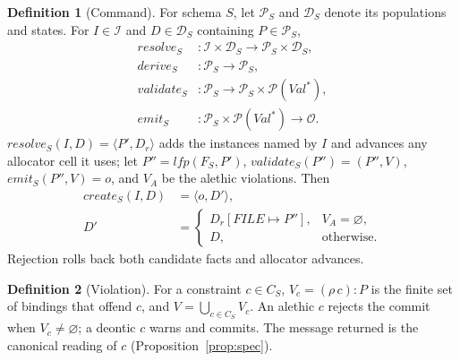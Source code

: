 \documentclass[10pt,twocolumn]{article}
\theoremstyle{plain}
\theoremstyle{definition}
\newtheorem{definition}{Definition}
\begin{document}
\begin{definition}[Command]\label{def:stages}
For schema $S$, let $\mathcal{P}_S$ and $\mathcal{D}_S$ denote its populations and states. For $I\in\mathcal{I}$ and $D\in\mathcal{D}_S$ containing $P\in\mathcal{P}_S$,
\[
\begin{aligned}
\mathit{resolve}_S &: \mathcal{I}\times\mathcal{D}_S \to \mathcal{P}_S\times\mathcal{D}_S,\\
\mathit{derive}_S &: \mathcal{P}_S\to\mathcal{P}_S,\\
\mathit{validate}_S &: \mathcal{P}_S\to\mathcal{P}_S\times\mathcal{P}(\mathit{Val}^{*}),\\
\mathit{emit}_S &: \mathcal{P}_S\times\mathcal{P}(\mathit{Val}^{*})\to\mathcal{O}.
\end{aligned}
\]
$\mathit{resolve}_S(I,D)=\langle P',D_r\rangle$ adds the instances named by $I$ and advances any allocator cell it uses; let $P''=\mathit{lfp}(F_S,P')$, $\mathit{validate}_S(P'')=(P'',V)$, $\mathit{emit}_S(P'',V)=o$, and $V_A$ be the alethic violations. Then
\begin{align}
\mathit{create}_S(I,D)&=\langle o,D'\rangle, \label{eq:create}\\[-0.4ex]
D'&=\begin{cases}
D_r[\mathit{FILE}\mapsto P''],&V_A=\varnothing,\\
D,&\text{otherwise}.
\end{cases}\nonumber
\end{align}
Rejection rolls back both candidate facts and allocator advances.
\end{definition}

\begin{definition}[Violation]\label{def:violation}
For a constraint $c\in C_S$, $V_c=(\rho\,c)\!:\!P$ is the finite set of bindings that offend $c$, and $V=\bigcup_{c\in C_S}V_c$. An alethic $c$ rejects the commit when $V_c\neq\varnothing$; a deontic $c$ warns and commits. The message returned is the canonical reading of $c$ (Proposition~\ref{prop:spec}).
\end{definition}
\end{document}

